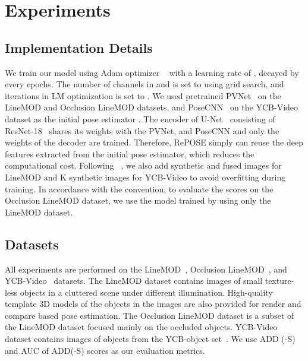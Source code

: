 \documentclass[10pt,twocolumn,letterpaper]{article}
\begin{document}
\section{Experiments}
\label{sec:experiments}

\subsection{Implementation Details}
We train our model using Adam optimizer ~\cite{DBLP:journals/corr/KingmaB14} with a learning rate of , decayed by  every  epochs. The number of channels  in  and  is set to  using grid search, and iterations  in LM optimization is set to .
We used pretrained PVNet~\cite{peng2019pvnet} on the LineMOD and Occlusion LineMOD datasets, and PoseCNN~\cite{xiang2018posecnn} on the YCB-Video~\cite{xiang2018posecnn} dataset as the initial pose estimator . The encoder of U-Net~\cite{RFB15a} consisting of ResNet-18~\cite{7780459} shares its weights with the PVNet, and PoseCNN and only the weights of the decoder are trained. Therefore, RePOSE simply can reuse the deep features extracted from the initial pose estimator, which reduces the computational cost. Following ~\cite{peng2019pvnet}, we also add  synthetic and fused images for LineMOD and K synthetic images for YCB-Video to avoid overfitting during training. In accordance with the convention, to evaluate the scores on the Occlusion LineMOD dataset, we use the model trained by using only the LineMOD dataset.

\subsection{Datasets}
All experiments are performed on the LineMOD~\cite{linemod}, Occlusion LineMOD~\cite{10.1007/978-3-319-10605-2_35}, and YCB-Video~\cite{xiang2018posecnn} datasets. The LineMOD dataset contains images of small texture-less objects in a cluttered scene under different illumination. High-quality template 3D models of the objects in the images are also provided for render and compare based pose estimation. The Occlusion LineMOD dataset is a subset of the LineMOD dataset focused mainly on the occluded objects. YCB-Video~\cite{xiang2018posecnn} dataset contains images of objects from the YCB-object set~\cite{7251504}. We use ADD (-S)~\cite{linemod} and AUC of ADD(-S) scores as our evaluation metrics.
\end{document}
